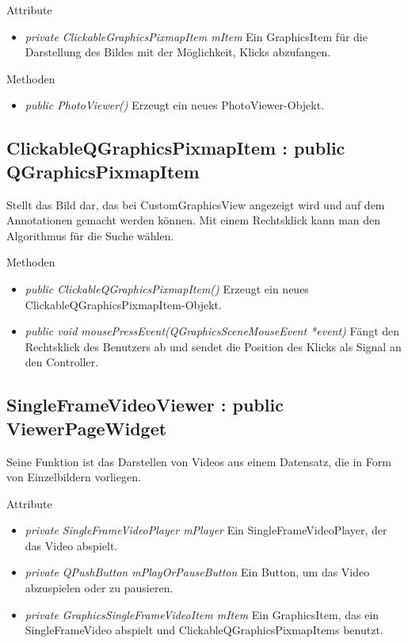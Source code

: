 Attribute
\begin{itemize}
	\item\textit{private ClickableGraphicsPixmapItem mItem} 
	Ein GraphicsItem für die Darstellung des Bildes mit der Möglichkeit, Klicks abzufangen.    
\end{itemize}

Methoden
\begin{itemize}
	\item\textit{public PhotoViewer()}
	 Erzeugt ein neues PhotoViewer-Objekt.
\end{itemize}

\subsection*{ClickableQGraphicsPixmapItem : public QGraphicsPixmapItem}
Stellt das Bild dar, das bei CustomGraphicsView angezeigt wird und auf dem Annotationen gemacht werden können. Mit einem Rechtsklick kann man den Algorithmus für die Suche wählen.

Methoden
\begin{itemize}
	\item\textit{public ClickableQGraphicsPixmapItem()} 
	Erzeugt ein neues ClickableQGraphicsPixmapItem-Objekt.
	\item\textit{public void mousePressEvent(QGraphicsSceneMouseEvent *event)} 
	Fängt den Rechtsklick des Benutzers ab und sendet die Position des Klicks als Signal an den Controller.
\end{itemize}

\subsection*{SingleFrameVideoViewer : public ViewerPageWidget}
Seine Funktion ist das Darstellen von Videos aus einem Datensatz, die in Form von Einzelbildern vorliegen.

Attribute
\begin{itemize}
	\item\textit{private SingleFrameVideoPlayer mPlayer} 
	Ein SingleFrameVideoPlayer, der das Video abspielt. 
	\item\textit{private QPushButton mPlayOrPauseButton} 
	Ein Button, um das Video abzuspielen oder zu pausieren.
	\item\textit{private GraphicsSingleFrameVideoItem mItem} 
	Ein GraphicsItem, das ein SingleFrameVideo abspielt und ClickableQGraphicsPixmapItems benutzt.
\end{itemize}

